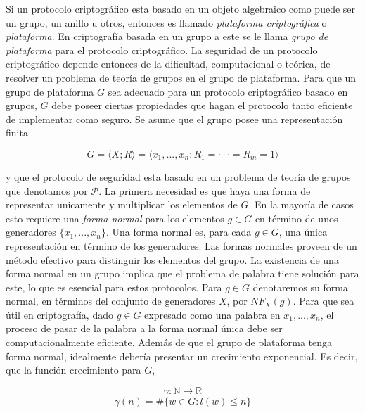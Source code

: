 \documentclass[12pt]{article}
\theoremstyle{definition}
\begin{document}
Si un protocolo criptográfico esta basado en un objeto algebraico como puede ser un grupo, un anillo u otros, entonces es llamado \textit{plataforma criptográfica} o \textit{plataforma}. En criptografía basada en un grupo a este se le llama \textit{grupo de plataforma} para el protocolo criptográfico. La seguridad de un protocolo criptográfico depende entonces de la dificultad, computacional o teórica, de resolver un problema de teoría de grupos en el grupo de plataforma.
\newline
\newline
Para que un grupo de plataforma $G$ sea adecuado para un protocolo criptográfico basado en grupos, $G$ debe poseer ciertas propiedades que hagan el protocolo tanto eficiente de implementar como seguro. Se asume que el grupo posee una representación finita

$$G = \langle X;R\rangle=\langle x_1,...,x_n: R_1=\cdot\cdot\cdot=R_m=1\rangle$$

y que el protocolo de seguridad esta basado en un problema de teoría de grupos que denotamos por $\mathcal{P}$. La primera necesidad es que haya una forma de representar unicamente y multiplicar los elementos de $G$. En la mayoría de casos esto requiere una \textit{forma normal} para los elementos $g\in G$ en término de unos generadores $\{x_1,...,x_n\}$. Una forma normal es, para cada $g\in G$, una única representación en término de los generadores. Las formas normales proveen de un método efectivo para distinguir los elementos del grupo. La existencia de una forma normal en un grupo implica que el problema de palabra tiene solución para este, lo que es esencial para estos protocolos. Para $g\in G$ denotaremos su forma normal, en términos del conjunto de generadores $X$, por $NF_X(g)$. Para que sea útil en criptografía, dado $g\in G$ expresado como una palabra en $x_1,...,x_n$, el proceso de pasar de la palabra a la forma normal única debe ser computacionalmente eficiente.
\newline
\newline
Además de que el grupo de plataforma tenga forma normal, idealmente debería presentar un crecimiento exponencial. Es decir, que la función crecimiento para $G$,

$$\gamma:\mathbb{N}\rightarrow\mathbb{R}$$
$$\gamma(n)=\#\{w\in G:l(w)\leq n\}$$
\end{document}
